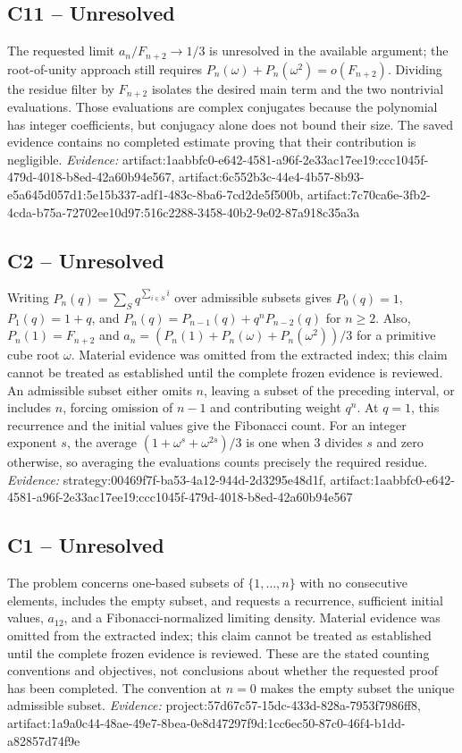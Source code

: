 \documentclass[11pt]{article}
\begin{document}
\subsection{C11 -- Unresolved}
The requested limit $a_n/F_{n+2}\to 1/3$ is unresolved in the available argument; the root-of-unity approach still requires $P_n(\omega)+P_n(\omega^2)=o(F_{n+2})$.
Dividing the residue filter by $F_{n+2}$ isolates the desired main term and the two nontrivial evaluations. Those evaluations are complex conjugates because the polynomial has integer coefficients, but conjugacy alone does not bound their size. The saved evidence contains no completed estimate proving that their contribution is negligible.
\textit{Evidence: }artifact:1aabbfc0-e642-4581-a96f-2e33ac17ee19:ccc1045f-479d-4018-b8ed-42a60b94e567, artifact:6c552b3c-44e4-4b57-8b93-e5a645d057d1:5e15b337-adf1-483c-8ba6-7cd2de5f500b, artifact:7c70ca6e-3fb2-4cda-b75a-72702ee10d97:516c2288-3458-40b2-9e02-87a918c35a3a
\subsection{C2 -- Unresolved}
Writing $P_n(q)=\sum_S q^{\sum_{i\in S}i}$ over admissible subsets gives $P_0(q)=1$, $P_1(q)=1+q$, and $P_n(q)=P_{n-1}(q)+q^nP_{n-2}(q)$ for $n\geq2$. Also, $P_n(1)=F_{n+2}$ and $a_n=(P_n(1)+P_n(\omega)+P_n(\omega^2))/3$ for a primitive cube root $\omega$.
Material evidence was omitted from the extracted index; this claim cannot be treated as established until the complete frozen evidence is reviewed. An admissible subset either omits $n$, leaving a subset of the preceding interval, or includes $n$, forcing omission of $n-1$ and contributing weight $q^n$. At $q=1$, this recurrence and the initial values give the Fibonacci count. For an integer exponent $s$, the average $(1+\omega^s+\omega^{2s})/3$ is one when $3$ divides $s$ and zero otherwise, so averaging the evaluations counts precisely the required residue.
\textit{Evidence: }strategy:00469f7f-ba53-4a12-944d-2d3295e48d1f, artifact:1aabbfc0-e642-4581-a96f-2e33ac17ee19:ccc1045f-479d-4018-b8ed-42a60b94e567
\subsection{C1 -- Unresolved}
The problem concerns one-based subsets of $\{1,\ldots,n\}$ with no consecutive elements, includes the empty subset, and requests a recurrence, sufficient initial values, $a_{12}$, and a Fibonacci-normalized limiting density.
Material evidence was omitted from the extracted index; this claim cannot be treated as established until the complete frozen evidence is reviewed. These are the stated counting conventions and objectives, not conclusions about whether the requested proof has been completed. The convention at $n=0$ makes the empty subset the unique admissible subset.
\textit{Evidence: }project:57d67c57-15dc-433d-828a-7953f7986ff8, artifact:1a9a0c44-48ae-49e7-8bea-0e8d47297f9d:1cc6ec50-87c0-46f4-b1dd-a82857d74f9e
\end{document}
